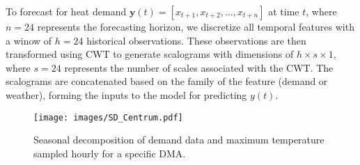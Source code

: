 To forecast for heat demand \(\mathbf{y}(t) = [x_{t+1}, x_{t+2}, ..., x_{t+n}]\) at time $t$, where \(n=24\) represents the forecasting horizon, we discretize all temporal features with a winow of $h=24$ historical observations. These observations are then transformed using CWT to generate scalograms with dimensions of $ h \times s \times 1$, where $s=24$ represents the number of scales associated with the CWT. The scalograms are concatenated based on the family of the feature (demand or weather), forming the inputs to the model for predicting $y(t)$.

\begin{figure}[htbp]
\centering
\texttt{[image: images/SD\_Centrum.pdf]}
\caption{Seasonal decomposition of demand data and maximum temperature sampled hourly for a specific DMA.}
\label{Fig2:SD}
\end{figure}



